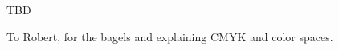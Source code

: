 \documentclass[sigconf,screen,review, anonymous]{acmart}
\begin{document}
TBD


\begin{acks}
To Robert, for the bagels and explaining CMYK and color spaces.
\end{acks}




\appendix
\end{document}

